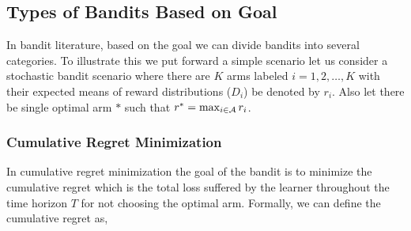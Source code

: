 %


%





\subsection{Types of Bandits Based on Goal}

In bandit literature, based on the goal we can divide bandits into several categories. To illustrate this we put forward a simple scenario let us consider a stochastic bandit scenario where there are $K$ arms labeled $i=1,2,\ldots, K$ with their expected means of reward distributions ($D_i$) be denoted by $r_i$. Also let there be single optimal arm $*$ such that $r^* = \max_{i\in\mathcal{A}}r_i$. 



\subsubsection{Cumulative Regret Minimization}
In cumulative regret minimization the goal of the bandit is to minimize the cumulative regret which is the total loss suffered by the learner throughout the time horizon $T$ for not choosing the optimal arm. Formally, we can define the cumulative regret as,

